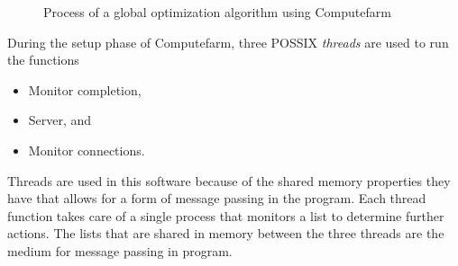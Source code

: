 \begin{figure}[!h]
    \centering
    
    \caption{Process of a global optimization algorithm using Computefarm}
    \label{fig:computefarm}
\end{figure}

During the setup phase of Computefarm, three POSSIX \textit{threads} are used to run the functions
\begin{itemize}
    \item Monitor completion,
    \item Server, and
    \item Monitor connections. 
\end{itemize}

Threads are used in this software because of the shared memory properties they have that allows for a form of message passing in the program. Each thread function takes care of a single process that monitors a list to determine further actions. The lists that are shared in memory between the three threads are the medium for message passing in program. 

